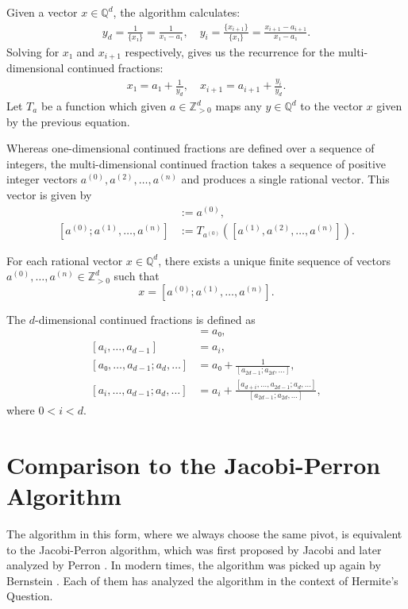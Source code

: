 \documentclass[english,version-2020-11]{uzl-thesis}
\begin{document}
Given a vector $x ∈ ℚ^d$, the algorithm calculates:
\begin{align*}
  y_d
  = \frac{1}{\{x₁\}}
  = \frac{1}{x₁ - a₁},
  \quad y_i
  = \frac{\{x_{i+1}\}}{\{x₁\}}
  = \frac{x_{i+1} - a_{i+1}}{x₁ - a₁}.
\end{align*}
Solving for $x₁$ and $x_{i+1}$ respectively,
gives us the recurrence for the multi-dimensional continued fractions:
\begin{align*}
  x₁ = a₁ + \frac{1}{y_d},
  \quad x_{i+1} = a_{i+1} + \frac{y_i}{y_d}.
\end{align*}
Let $T_a$ be a function which given $a ∈ ℤ_{> 0}^d$ maps any $y ∈ ℚ^d$ to the vector $x$ given by
the previous equation.

Whereas one-dimensional continued fractions are defined over a sequence of integers,
the multi-dimensional continued fraction takes a sequence of positive integer vectors
$a^{(0)}, a^{(2)}, \dots, a^{(n)}$ and produces a single rational vector.
This vector is given by
\begin{align*}
  [a^{(0)}] & := a^{(0)}, \\
  [a^{(0)}; a^{(1)}, \dots, a^{(n)}] & := T_{a^{(0)}}([a^{(1)}, a^{(2)}, \dots, a^{(n)}]).
\end{align*}

\begin{lemma}
  For each rational vector $x ∈ ℚ^d$, there exists a unique finite sequence of vectors $a^{(0)}, \dots, a^{(n)} ∈ ℤ_{> 0}^d$
  such that
  \[
    x = [a^{(0)}; a^{(1)}, \dots, a^{(n)}].
  \]
\end{lemma}

The $d$-dimensional continued fractions is defined as
\begin{align*}
  [a₀, \dots, a_{d-1}] & = a₀, \\
  [a_i, \dots, a_{d-1}] & = a_i, \\
  [a₀, \dots, a_{d-1}; a_d, \dots]
  & = a₀ + \frac{1}{[a_{2d-1}; a_{2d}, \dots]}, \\
  [a_i, \dots, a_{d-1}; a_d, \dots]
  & = a_i + \frac{[a_{d+i}, \dots, a_{2d - 1}; a_d, \dots]}{[a_{2d-1}; a_{2d}, \dots]},
\end{align*}
where $0 < i < d$.

\section{Comparison to the Jacobi-Perron Algorithm}

The algorithm in this form, where we always choose the same pivot,
is equivalent to the Jacobi-Perron algorithm, which was first proposed
by Jacobi \cite{Jacobi68} and later analyzed by Perron \cite{Perron07}.
In modern times, the algorithm was picked up again by Bernstein \cite{Bernstein06}.
Each of them has analyzed the algorithm in the context of Hermite's Question.
\end{document}
